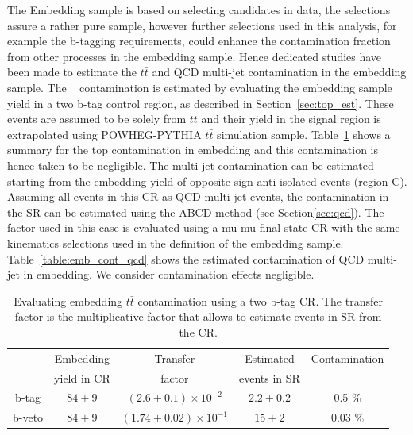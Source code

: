 
The Embedding sample is based on selecting \Zmumu candidates in data, the selections assure a rather 
pure \Zmumu sample, however further selections used in this analysis, for example the b-tagging requirements, 
could enhance the contamination fraction from other processes in the embedding sample. Hence dedicated studies have been
made to estimate the $t\bar{t}$ and QCD multi-jet contamination in the embedding sample.
The \ttbar~ contamination is estimated by evaluating the embedding sample yield in a two b-tag control region,
as described in Section~\ref{sec:top_est}. These events are assumed to be solely from $t\bar{t}$
and their yield in the signal region is extrapolated using POWHEG-PYTHIA $t\bar{t}$ simulation sample.
Table~\ref{table:emb_cont_tt} shows a summary for the top contamination in embedding and this contamination is hence taken to be negligible. The multi-jet contamination can be estimated starting 
from the embedding yield of opposite sign anti-isolated events (region C).
Assuming all events in this CR as QCD multi-jet events, the contamination in the SR 
can be estimated using the ABCD method (see Section\ref{sec:qcd}). The \rqcd factor 
used in this case is evaluated using a mu-mu final state CR with the same kinematics selections
used in the definition of the embedding sample. Table~\ref{table:emb_cont_qcd}
shows the estimated contamination of QCD multi-jet in embedding. 
We  consider contamination effects negligible.


\begin{table} [tp]
\centering
\begin{tabular}{c c c c c}
\hline
\hline
 & Embedding	& Transfer	& Estimated	& Contamination \\
 & yield in CR	& factor	& events in SR	&	\\		 [0.5ex]
\hline
b-tag & $84 \pm 9$  & $(2.6 \pm 0.1) \times 10^{-2}$ &  $2.2 \pm 0.2$&  0.5 \% \\
b-veto & $84 \pm 9$ & $(1.74 \pm 0.02) \times 10^{-1}$ & $15 \pm 2$ & 0.03 \% \\[1ex]
\hline
\end{tabular}
\caption{Evaluating embedding $t\bar{t}$ contamination using a two b-tag CR. The transfer factor is the
multiplicative factor that allows to estimate events in SR from the CR. }
\label{table:emb_cont_tt}
\end{table}

